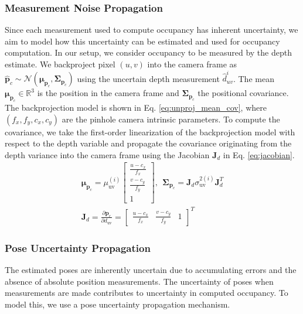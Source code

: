 \subsubsection{Measurement Noise Propagation} \label{sss:mnp}
Since each measurement used to compute occupancy has inherent uncertainty, we aim to model how this uncertainty can be estimated and used for occupancy computation.
In our setup, we consider occupancy to be measured by the depth estimate.
We backproject pixel $(u,v)$ into the camera frame as $\widehat{\mathbf{p}}_c \sim \mathcal{N}(\boldsymbol{\mu}_{\mathbf{p}_c}, \mathbf{\Sigma}_{\mathbf{p}_c})$ using the uncertain depth measurement $\widehat{d}_{uv}^i$. The mean $\boldsymbol{\mu}_{\mathbf{p}_c} \in \mathbb{R}^3$ is the position in the camera frame and $\mathbf{\Sigma}_{\mathbf{p}_c}$ the positional covariance. 
The backprojection model is shown in Eq. \eqref{eq:unproj_mean_cov}, where $\left(f_x, f_y, c_x, c_y\right)$ are the pinhole camera intrinsic parameters.
To compute the covariance, we take the first-order linearization of the backprojection model with respect to the depth variable and propagate the covariance originating from the depth variance into the camera frame using the Jacobian $\boldsymbol{J}_d$ in Eq. \eqref{eq:jacobian}.
\begin{gather}
    \boldsymbol{\mu}_{\mathbf{p}_c} = \mu_\text{uv}^{(i)}\begin{bmatrix}\frac{u-c_x}{f_x} \\ \frac{v-c_y}{f_y} \\ 1\end{bmatrix}, \ \  
    \mathbf{\Sigma}_{\mathbf{p}_c} = \boldsymbol{J}_d \sigma_\text{uv}^{2(i)} \boldsymbol{J}_d^T \label{eq:unproj_mean_cov} \\
    \boldsymbol{J}_d = \frac{\partial{\mathbf{p}_c}}{\partial d_\text{uv}} = \begin{bmatrix}\frac{u-c_x}{f_x} & \frac{v-c_y}{f_y} & 1\end{bmatrix}^T \label{eq:jacobian}
\end{gather}

\subsubsection{Pose Uncertainty Propagation} \label{sss:pup}
The estimated poses are inherently uncertain due to accumulating errors and the absence of absolute position measurements.
The uncertainty of poses when measurements are made contributes to uncertainty in computed occupancy.
To model this, we use a pose uncertainty propagation mechanism.


